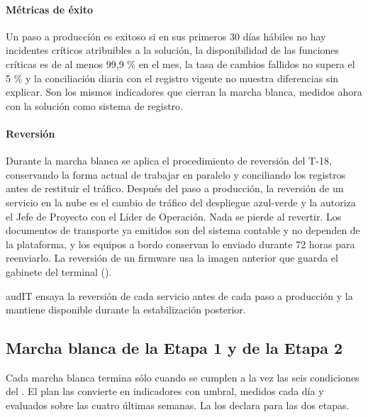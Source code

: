 \paragraph{Métricas de éxito}
Un paso a producción es exitoso si en sus primeros 30 días hábiles no hay incidentes críticos atribuibles
a la solución, la disponibilidad de las funciones críticas es de al menos 99,9 \% en el mes, la tasa de
cambios fallidos no supera el 5 \%  y la conciliación diaria con el registro vigente no
muestra diferencias sin explicar. Son los mismos indicadores que cierran la marcha blanca, medidos ahora
con la solución como sistema de registro.

\paragraph{Reversión}
Durante la marcha blanca se aplica el procedimiento de reversión del T-18, conservando la forma actual de trabajar en paralelo y conciliando los registros antes de restituir el tráfico. Después del paso a producción, la reversión de un servicio en la nube es el cambio
de tráfico del despliegue azul-verde y la autoriza el Jefe de Proyecto con el Líder de Operación. Nada se
pierde al revertir. Los documentos de transporte ya emitidos son del sistema contable y no dependen de la
plataforma, y los equipos a bordo conservan lo enviado durante 72 horas para reenviarlo. La reversión de
un firmware usa la imagen anterior que guarda el gabinete del terminal ().

\begin{compromiso}[metrica={Reversión de un servicio en la nube en no más de 15 minutos, sin pérdida de eventos},
                   verifica={Ensayo de reversión en preproducción antes de cada paso a producción},
                   fuente={\caso{numeral 13.3}{27} y \art{17.1}{12}}]
audIT ensaya la reversión de cada servicio antes de cada paso a producción y la mantiene disponible durante la estabilización posterior.
\end{compromiso}

\subsection{Marcha blanca de la Etapa 1 y de la Etapa 2}\label{sec:7-marcha-blanca}

Cada marcha blanca termina sólo cuando se cumplen a la vez las seis condiciones del . El
plan las convierte en indicadores con umbral, medidos cada día y evaluados sobre las cuatro últimas
semanas. La  los declara para las dos etapas.

